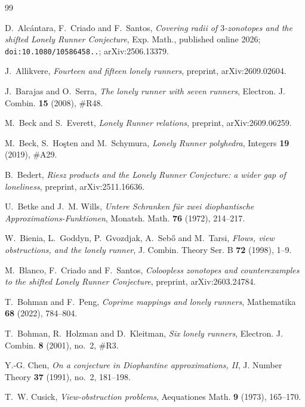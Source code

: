 \documentclass[11pt]{article}
\theoremstyle{definition}
\begin{document}
\begin{thebibliography}{99}

D.~Alc\'antara, F.~Criado and F.~Santos, \emph{Covering radii of
$3$-zonotopes and the shifted Lonely Runner Conjecture}, Exp. Math.,
published online 2026;
\texttt{doi:10.1080/10586458..};
arXiv:2506.13379.

J.~Allikvere, \emph{Fourteen and fifteen lonely runners}, preprint,
arXiv:2609.02604.

J.~Barajas and O.~Serra, \emph{The lonely runner with seven runners},
Electron. J. Combin. \textbf{15} (2008), \#R48.

M.~Beck and S.~Everett, \emph{Lonely Runner relations}, preprint,
arXiv:2609.06259.

M.~Beck, S.~Ho\c{s}ten and M.~Schymura, \emph{Lonely Runner polyhedra},
Integers \textbf{19} (2019), \#A29.

B.~Bedert, \emph{Riesz products and the Lonely Runner Conjecture: a
wider gap of loneliness}, preprint, arXiv:2511.16636.

U.~Betke and J.~M. Wills, \emph{Untere Schranken f\"ur zwei
diophantische Approximations-Funktionen}, Monatsh. Math. \textbf{76}
(1972), 214--217.

W.~Bienia, L.~Goddyn, P.~Gvozdjak, A.~Seb\H{o} and M.~Tarsi,
\emph{Flows, view obstructions, and the lonely runner}, J. Combin.
Theory Ser. B \textbf{72} (1998), 1--9.

M.~Blanco, F.~Criado and F.~Santos, \emph{Coloopless zonotopes and
counterexamples to the shifted Lonely Runner Conjecture}, preprint,
arXiv:2603.24784.

T.~Bohman and F.~Peng, \emph{Coprime mappings and lonely runners},
Mathematika \textbf{68} (2022), 784--804.

T.~Bohman, R.~Holzman and D.~Kleitman, \emph{Six lonely runners},
Electron. J. Combin. \textbf{8} (2001), no.~2, \#R3.

Y.-G. Chen, \emph{On a conjecture in Diophantine approximations, II},
J. Number Theory \textbf{37} (1991), no.~2, 181--198.

T.~W. Cusick, \emph{View-obstruction problems}, Aequationes Math.
\textbf{9} (1973), 165--170.


\end{thebibliography}
\end{document}
